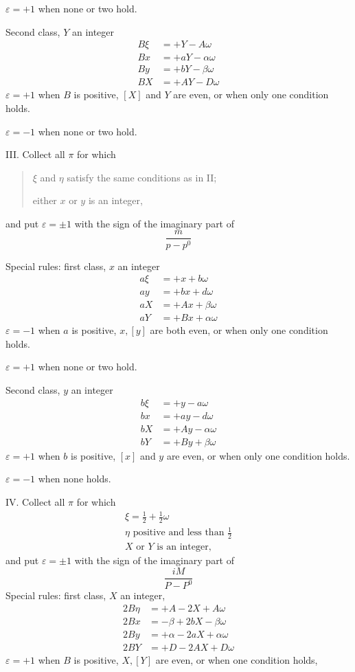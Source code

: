 $\varepsilon=+1$ when none or two hold.

Second class, $Y$ an integer
\[
\begin{aligned}
B\xi&=+Y-A\omega\\
Bx&=+aY-\alpha\omega\\
By&=+bY-\beta\omega\\
BX&=+AY-D\omega
\end{aligned}
\]
$\varepsilon=+1$ when $B$ is positive, $[X]$ and $Y$ are even, or when only one condition holds.

$\varepsilon=-1$ when none or two hold.

\clearpage
{}
III. Collect all $\pi$ for which
\begin{quote}
$\xi$ and $\eta$ satisfy the same conditions as in II;\par
either $x$ or $y$ is an integer,
\end{quote}
and put $\varepsilon=\pm1$ with the sign of the imaginary part of
\[
\frac{m}{p-p^0}
\]

Special rules: first class, $x$ an integer
\[
\begin{aligned}
a\xi&=+x+b\omega\\
ay&=+bx+d\omega\\
aX&=+Ax+\beta\omega\\
aY&=+Bx+\alpha\omega
\end{aligned}
\]
$\varepsilon=-1$ when $a$ is positive, $x,[y]$ are both even, or when only one condition holds.

$\varepsilon=+1$ when none or two hold.

Second class, $y$ an integer
\[
\begin{aligned}
b\xi&=+y-a\omega\\
bx&=+ay-d\omega\\
bX&=+Ay-\alpha\omega\\
bY&=+By+\beta\omega
\end{aligned}
\]
$\varepsilon=+1$ when $b$ is positive, $[x]$ and $y$ are even, or when only one condition holds.

$\varepsilon=-1$ when none holds.

\clearpage
{}
IV. Collect all $\pi$ for which
\[
\begin{array}{l}
\xi=\frac12+\frac12\omega\\
\eta\text{ positive and less than }\frac12\\
X\text{ or }Y\text{ is an integer,}
\end{array}
\]
and put $\varepsilon=\pm1$ with the sign of the imaginary part of
\[
\frac{iM}{P-P^0}
\]
Special rules: first class, $X$ an integer,
\[
\begin{aligned}
2B\eta&=+A-2X+A\omega\\
2Bx&=-\beta+2bX-\beta\omega\\
2By&=+\alpha-2aX+\alpha\omega\\
2BY&=+D-2AX+D\omega
\end{aligned}
\]
$\varepsilon=+1$ when $B$ is positive, $X,[Y]$ are even, or when one condition holds,

